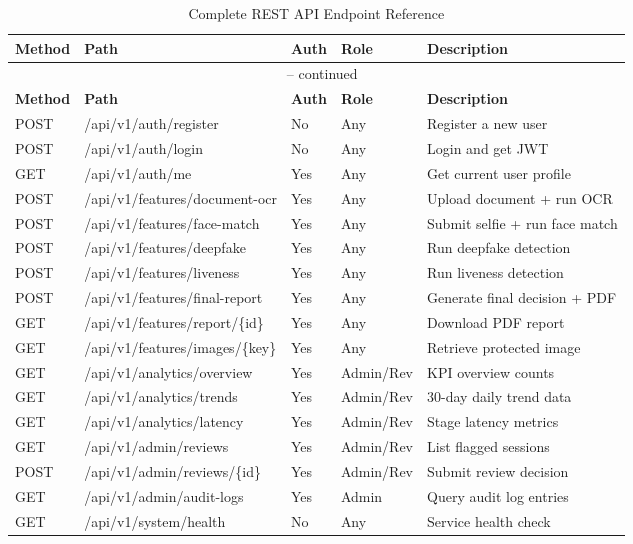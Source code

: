 \begin{longtable}{@{}p{1cm}p{5cm}p{1.5cm}p{2.5cm}p{4cm}@{}}
\caption{Complete REST API Endpoint Reference} \\
\toprule
\textbf{Method} & \textbf{Path} & \textbf{Auth} & \textbf{Role} & \textbf{Description} \\
\midrule
\endfirsthead
\multicolumn{5}{c}{\tablename\ \thetable{} -- continued} \\
\toprule
\textbf{Method} & \textbf{Path} & \textbf{Auth} & \textbf{Role} & \textbf{Description} \\
\midrule
\endhead
POST & /api/v1/auth/register & No & Any & Register a new user \\
POST & /api/v1/auth/login & No & Any & Login and get JWT \\
GET & /api/v1/auth/me & Yes & Any & Get current user profile \\
POST & /api/v1/features/document-ocr & Yes & Any & Upload document + run OCR \\
POST & /api/v1/features/face-match & Yes & Any & Submit selfie + run face match \\
POST & /api/v1/features/deepfake & Yes & Any & Run deepfake detection \\
POST & /api/v1/features/liveness & Yes & Any & Run liveness detection \\
POST & /api/v1/features/final-report & Yes & Any & Generate final decision + PDF \\
GET & /api/v1/features/report/\{id\} & Yes & Any & Download PDF report \\
GET & /api/v1/features/images/\{key\} & Yes & Any & Retrieve protected image \\
GET & /api/v1/analytics/overview & Yes & Admin/Rev & KPI overview counts \\
GET & /api/v1/analytics/trends & Yes & Admin/Rev & 30-day daily trend data \\
GET & /api/v1/analytics/latency & Yes & Admin/Rev & Stage latency metrics \\
GET & /api/v1/admin/reviews & Yes & Admin/Rev & List flagged sessions \\
POST & /api/v1/admin/reviews/\{id\} & Yes & Admin/Rev & Submit review decision \\
GET & /api/v1/admin/audit-logs & Yes & Admin & Query audit log entries \\
GET & /api/v1/system/health & No & Any & Service health check \\
\bottomrule
\end{longtable}

